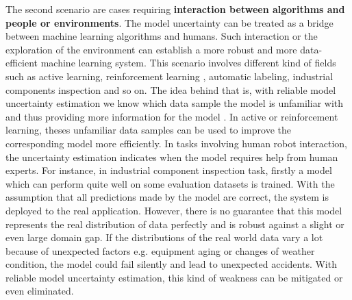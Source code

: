 The second scenario are cases requiring \textbf{interaction between algorithms and people or environments}. The model uncertainty can be treated as a bridge between machine learning algorithms and humans. Such interaction or the exploration of the environment can establish a more robust and more data-efficient machine learning system. This scenario involves different kind of fields such as active learning\cite{gal2017deep}, reinforcement learning\cite{blundell2015weight}\cite{osband2016deep}\cite{gal2016improving} %
, automatic labeling, industrial components inspection 
and so on. The idea behind that is, with reliable model uncertainty estimation we know which data sample the model is unfamiliar with and thus providing more information for the model 
. In active or reinforcement learning, theses unfamiliar data samples can be used to improve the corresponding model more efficiently. In tasks involving human robot interaction, the uncertainty estimation indicates when the model requires help from human experts. For instance, in industrial component inspection task, firstly a model which can perform quite well on some evaluation datasets is trained. With the assumption that all predictions made by the model are correct, the system is deployed to the real application.
However, there is no guarantee that this model represents the real distribution of data perfectly and is robust against a slight or even large domain gap. If the distributions of the real world data vary a lot because of unexpected factors e.g. equipment aging or changes of weather condition, the model could fail silently and lead to unexpected accidents. With reliable model uncertainty estimation, this kind of weakness can be mitigated or even eliminated. 

